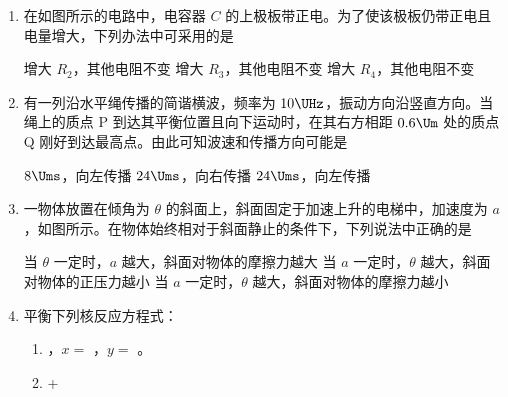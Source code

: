 \documentclass[\gkver]{gaokaozhenti}
\begin{document}
\begin{enumerate}
\item
在如图所示的电路中，电容器 $C$ 的上极板带正电。为了使该极板仍带正电且电量增大，下列办法中可采用的是


{增大 $R_{2}$，其他电阻不变}
{增大 $R_{3}$，其他电阻不变}
{增大 $R_{4}$，其他电阻不变}


\item
有一列沿水平绳传播的简谐横波，频率为 $10\UHz$，振动方向沿竖直方向。当绳上的质点 P 到达其平衡位置且向下运动时，在其右方相距 $0.6\Um$ 处的质点 Q 刚好到达最高点。由此可知波速和传播方向可能是

{$8\Ums$，向左传播}
{$24\Ums$，向右传播}
{$24\Ums$，向左传播}


\item
一物体放置在倾角为 $\theta$ 的斜面上，斜面固定于加速上升的电梯中，加速度为 $a$，如图所示。在物体始终相对于斜面静止的条件下，下列说法中正确的是

\onepicture[align=right, w=4.21cm]{}

{当 $\theta$ 一定时，$a$ 越大，斜面对物体的摩擦力越大}
{当 $a$ 一定时，$\theta$ 越大，斜面对物体的正压力越小}
{当 $a$ 一定时，$\theta$ 越大，斜面对物体的摩擦力越小}


\item
平衡下列核反应方程式：
\begin{enumerate}
	\item
	，$x=$ \tkanswer[1.5cm]{}，$y=$ \tkanswer[2.2cm]{}。
	\item
	 + \tkanswer[2.6cm]{}
\end{enumerate}


\end{enumerate}
\end{document}
